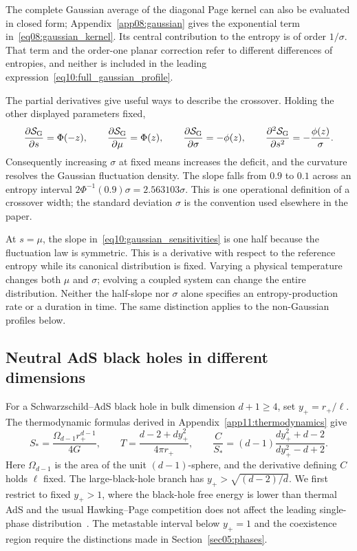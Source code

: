 \documentclass[11pt,letterpaper]{article}
\theoremstyle{plain}
\theoremstyle{definition}
\theoremstyle{remark}
\begin{document}
The complete Gaussian average of the diagonal Page kernel can also be evaluated in closed form; Appendix~\ref{app08:gaussian} gives the exponential term in~\eqref{eq08:gaussian_kernel}. Its central contribution to the entropy is of order $1/\sigma$. That term and the order-one planar correction refer to different differences of entropies, and neither is included in the leading expression~\eqref{eq10:full_gaussian_profile}.

The partial derivatives give useful ways to describe the crossover. Holding the other displayed parameters fixed,
\begin{equation}
 \frac{\partial{\cal S}_{\mathrm G}}{\partial s}=\Phi(-z),
 \qquad
 \frac{\partial{\cal S}_{\mathrm G}}{\partial\mu}=\Phi(z),
 \qquad
 \frac{\partial{\cal S}_{\mathrm G}}{\partial\sigma}=-\phi(z),
 \qquad
 \frac{\partial^2{\cal S}_{\mathrm G}}{\partial s^2}
 =-\frac{\phi(z)}{\sigma}.
 \label{eq10:gaussian_sensitivities}
\end{equation}
Consequently increasing $\sigma$ at fixed means increases the deficit, and the curvature resolves the Gaussian fluctuation density. The slope falls from $0.9$ to $0.1$ across an entropy interval $2\Phi^{-1}(0.9)\sigma=2.563103\sigma$. This is one operational definition of a crossover width; the standard deviation $\sigma$ is the convention used elsewhere in the paper.

At $s=\mu$, the slope in~\eqref{eq10:gaussian_sensitivities} is one half because the fluctuation law is symmetric. This is a derivative with respect to the reference entropy while its canonical distribution is fixed. Varying a physical temperature changes both $\mu$ and $\sigma$; evolving a coupled system can change the entire distribution. Neither the half-slope nor $\sigma$ alone specifies an entropy-production rate or a duration in time. The same distinction applies to the non-Gaussian profiles below.

\subsection{Neutral AdS black holes in different dimensions}

For a Schwarzschild--AdS black hole in bulk dimension $d+1\geq4$, set $y_+=r_+/\ell$. The thermodynamic formulas derived in Appendix~\ref{app11:thermodynamics} give
\begin{equation}
 S_* =\frac{\Omega_{d-1}r_+^{d-1}}{4G},\qquad
 T=\frac{d-2+d y_+^2}{4\pi r_+},\qquad
 \frac{C}{S_*}=(d-1)\frac{d y_+^2+d-2}{d y_+^2-d+2}.
 \label{eq10:neutral_width}
\end{equation}
Here $\Omega_{d-1}$ is the area of the unit $(d-1)$-sphere, and the derivative defining $C$ holds $\ell$ fixed. The large-black-hole branch has $y_+>\sqrt{(d-2)/d}$. We first restrict to fixed $y_+>1$, where the black-hole free energy is lower than thermal AdS and the usual Hawking--Page competition does not affect the leading single-phase distribution~\cite{hawkingpage1983,witten1998}. The metastable interval below $y_+=1$ and the coexistence region require the distinctions made in Section~\ref{sec05:phases}.
\end{document}
